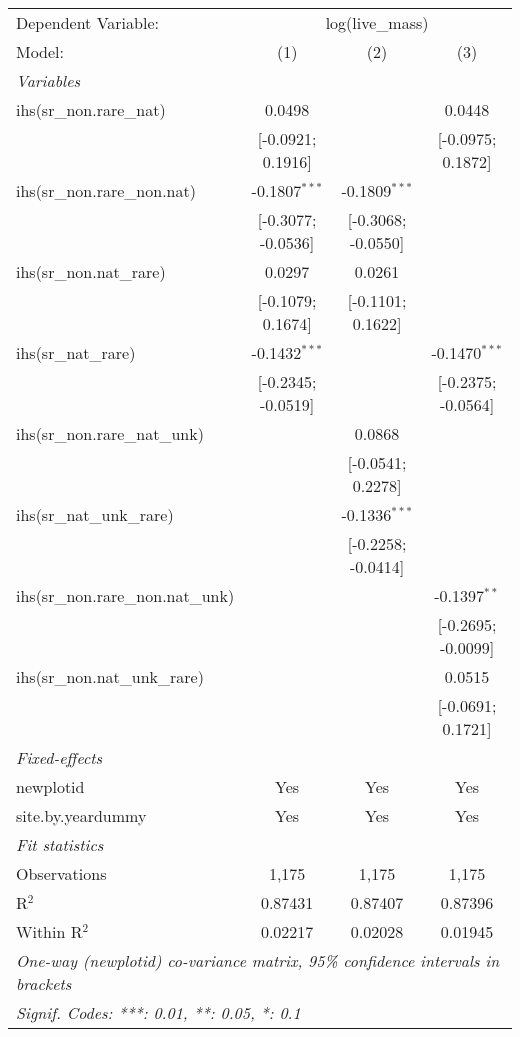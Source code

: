 \begin{tabular}{lccc}
\tabularnewline\midrule\midrule
Dependent Variable:&\multicolumn{3}{c}{log(live\_mass)}\\
Model:&(1) & (2) & (3)\\
\midrule \emph{Variables}&   &   &  \\
ihs(sr\_non.rare\_nat)&0.0498 &    & 0.0448\\
  &[-0.0921; 0.1916] &    & [-0.0975; 0.1872]\\
ihs(sr\_non.rare\_non.nat)&-0.1807$^{***}$ & -0.1809$^{***}$ &   \\
  &[-0.3077; -0.0536] & [-0.3068; -0.0550] &   \\
ihs(sr\_non.nat\_rare)&0.0297 & 0.0261 &   \\
  &[-0.1079; 0.1674] & [-0.1101; 0.1622] &   \\
ihs(sr\_nat\_rare)&-0.1432$^{***}$ &    & -0.1470$^{***}$\\
  &[-0.2345; -0.0519] &    & [-0.2375; -0.0564]\\
ihs(sr\_non.rare\_nat\_unk)&   & 0.0868 &   \\
  &   & [-0.0541; 0.2278] &   \\
ihs(sr\_nat\_unk\_rare)&   & -0.1336$^{***}$ &   \\
  &   & [-0.2258; -0.0414] &   \\
ihs(sr\_non.rare\_non.nat\_unk)&   &    & -0.1397$^{**}$\\
  &   &    & [-0.2695; -0.0099]\\
ihs(sr\_non.nat\_unk\_rare)&   &    & 0.0515\\
  &   &    & [-0.0691; 0.1721]\\
\midrule \emph{Fixed-effects}&   &   &  \\
newplotid & Yes & Yes & Yes\\
site.by.yeardummy & Yes & Yes & Yes\\
\midrule \emph{Fit statistics}&  & & \\
Observations & 1,175&1,175&1,175\\
R$^2$ & 0.87431&0.87407&0.87396\\
Within R$^2$ & 0.02217&0.02028&0.01945\\
\midrule\midrule\multicolumn{4}{l}{\emph{One-way (newplotid) co-variance matrix, 95\% confidence intervals in brackets}}\\
\multicolumn{4}{l}{\emph{Signif. Codes: ***: 0.01, **: 0.05, *: 0.1}}\\
\end{tabular}


